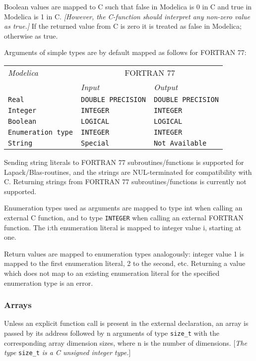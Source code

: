 Boolean values are mapped to C such that false in Modelica is 0 in C and
true in Modelica is 1 in C. \emph{{[}However, the C-function should
interpret any non-zero value as true.{]}} If the returned value from C
is zero it is treated as false in Modelica; otherwise as true.

Arguments of simple types are by default mapped as follows for FORTRAN
77:

\begin{longtable}[]{|l|l|l|}
\hline
\emph{Modelica} & \multicolumn{2}{c|}{FORTRAN 77}\\
& \emph{Input} & \emph{Output}\\ \hline
\endhead
\lstinline!Real! & \lstinline!DOUBLE PRECISION! & \lstinline!DOUBLE PRECISION!\\ \hline
\lstinline!Integer! & \lstinline!INTEGER! & \lstinline!INTEGER!\\ \hline
\lstinline!Boolean! & \lstinline!LOGICAL! & \lstinline!LOGICAL!\\ \hline
\lstinline!Enumeration type! & \lstinline!INTEGER! & \lstinline!INTEGER!\\ \hline
\lstinline!String! & \lstinline!Special! & \lstinline!Not Available!\\ \hline
\end{longtable}

Sending string literals to FORTRAN 77 subroutines/functions is supported
for Lapack/Blas-routines, and the strings are NUL-terminated for
compatibility with C. Returning strings from FORTRAN 77
subroutines/functions is currently not supported.

Enumeration types used as arguments are mapped to type int when calling
an external C function, and to type \lstinline!INTEGER! when calling an external
FORTRAN function. The i:th enumeration literal is mapped to integer
value i, starting at one.

Return values are mapped to enumeration types analogously: integer value
1 is mapped to the first enumeration literal, 2 to the second, etc.
Returning a value which does not map to an existing enumeration literal
for the specified enumeration type is an error.

\subsubsection{Arrays}

Unless an explicit function call is present in the external declaration,
an array is passed by its address followed by n arguments of type
\lstinline!size_t! with the corresponding array dimension sizes, where n is the
number of dimensions. {[}\emph{The type} \lstinline!size_t! \emph{is a C unsigned
integer type.}{]}

